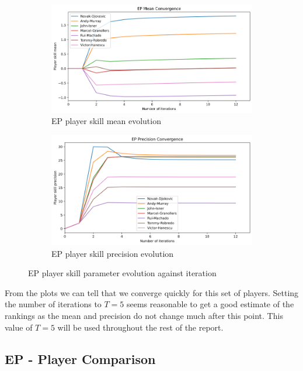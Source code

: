 \documentclass[]{article}
\begin{document}
\begin{figure}[!h]
	\begin{subfigure}{0.5\linewidth}
		\centering
		\includegraphics[width=\linewidth]{ep-mean.png}
		\caption{EP player skill mean evolution}
		\label{fig:ep-mean}
	\end{subfigure}
	\begin{subfigure}{0.5\linewidth}
		\centering
		\includegraphics[width=\linewidth]{ep-precision.png}
		\caption{EP player skill precision evolution}
		\label{fig:ep-precision}
	\end{subfigure}
	\caption{EP player skill parameter evolution against iteration}
	\label{fig:ep-evolution}
\end{figure}

From the plots we can tell that we converge quickly for this set of players. Setting the number of iterations to $T=5$ seems reasonable to get a good estimate of the rankings as the mean and precision do not change much after this point. This value of $T=5$ will be used throughout the rest of the report.

\clearpage
\subsection{EP - Player Comparison}
\end{document}
